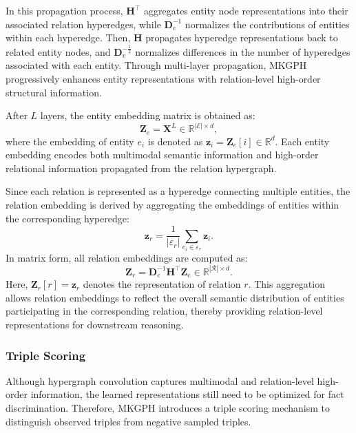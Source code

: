 \documentclass[pdflatex,sn-mathphys-num]{sn-jnl}
\begin{document}
In this propagation process, $\mathbf{H}^{\top}$ aggregates entity node representations into their associated relation hyperedges, while $\mathbf{D}_{e}^{-1}$ normalizes the contributions of entities within each hyperedge. Then, $\mathbf{H}$ propagates hyperedge representations back to related entity nodes, and $\mathbf{D}_{v}^{-\frac{1}{2}}$ normalizes differences in the number of hyperedges associated with each entity. Through multi-layer propagation, MKGPH progressively enhances entity representations with relation-level high-order structural information.

After $L$ layers, the entity embedding matrix is obtained as:
\begin{equation}
\mathbf{Z}_{e}=\mathbf{X}^{L}\in\mathbb{R}^{|\mathcal{E}|\times d},
\end{equation}
where the embedding of entity $e_i$ is denoted as $\mathbf{z}_i=\mathbf{Z}_{e}[i]\in\mathbb{R}^{d}$. Each entity embedding encodes both multimodal semantic information and high-order relational information propagated from the relation hypergraph.

Since each relation is represented as a hyperedge connecting multiple entities, the relation embedding is derived by aggregating the embeddings of entities within the corresponding hyperedge:
\begin{equation}
\mathbf{z}_r
=
\frac{1}{|\varepsilon_r|}
\sum_{e_i\in\varepsilon_r}
\mathbf{z}_i.
\end{equation}
In matrix form, all relation embeddings are computed as:
\begin{equation}
\mathbf{Z}_{r}
=
\mathbf{D}_{e}^{-1}
\mathbf{H}^{\top}
\mathbf{Z}_{e}
\in
\mathbb{R}^{|\mathcal{R}|\times d}.
\end{equation}
Here, $\mathbf{Z}_{r}[r]=\mathbf{z}_r$ denotes the representation of relation $r$. This aggregation allows relation embeddings to reflect the overall semantic distribution of entities participating in the corresponding relation, thereby providing relation-level representations for downstream reasoning.

\subsubsection{Triple Scoring}

Although hypergraph convolution captures multimodal and relation-level high-order information, the learned representations still need to be optimized for fact discrimination. Therefore, MKGPH introduces a triple scoring mechanism to distinguish observed triples from negative sampled triples.
\end{document}

